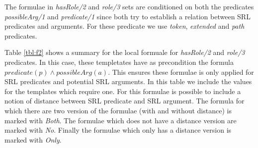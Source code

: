 The formulae in \emph{hasRole/2} and \emph{role/3} sets are conditioned on both 
the predicates \emph{possibleArg/1} and \emph{predicate/1} since both try 
to establish a relation between SRL predicates and arguments. For these predicate 
we use \emph{token}, \emph{extended} and \emph{path} predicates.

Table \ref{tbl:f2} shows a summary for the local formuale for \emph{hasRole/2} and \emph{role/3} predicates. In this case, these templetates have as precondition the formula $predicate(p) \land possibleArg(a)$. This ensures these formulae is only applied for SRL predicates and potential SRL arguments. In this table we include the values for the templates which require one. For this formulae is possible to include a notion of distance between SRL predicate and SRL argument. The formula for which there are two version of the formulae (with and without distance) is marked with \emph{Both}. The formulae which does not have a distance version are marked with \emph{No}. Finally the formulae which only has a distance version is marked with \emph{Only}.   
